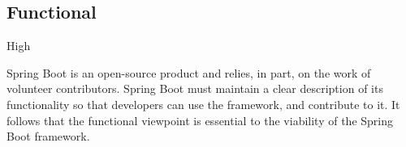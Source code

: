 \subsection*{Functional}

\ranking High

Spring Boot is an open-source product and relies, in part, on the work of volunteer contributors. Spring Boot must maintain a clear description of its functionality so that developers can use the framework, and contribute to it. It follows that the functional viewpoint is essential to the viability of the Spring Boot framework.